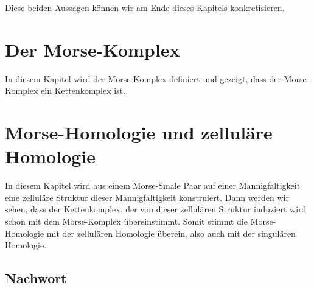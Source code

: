 \documentclass[a4paper,11pt,twoside]{scrreport}
\begin{document}
Diese beiden Aussagen können wir am Ende dieses Kapitels konkretisieren.







\begingroup
\let\clearpage\relax
\chapter{Der Morse-Komplex}
\endgroup

In diesem Kapitel wird der Morse Komplex definiert und gezeigt, dass der 
Morse-Komplex ein Kettenkomplex ist.




\begingroup
\let\clearpage\relax
\chapter{Morse-Homologie und zelluläre Homologie}
\endgroup


In diesem Kapitel wird aus einem Morse-Smale Paar auf einer Mannigfaltigkeit
eine zelluläre Struktur dieser Mannigfaltigkeit konstruiert. Dann werden wir 
sehen, dass der Kettenkomplex, der von dieser zellulären Struktur induziert wird schon mit
dem Morse-Komplex übereinstimmt. Somit stimmt die Morse-Homologie mit der 
zellulären Homologie überein, also auch mit der singulären Homologie.





\section*{Nachwort}
\end{document}
